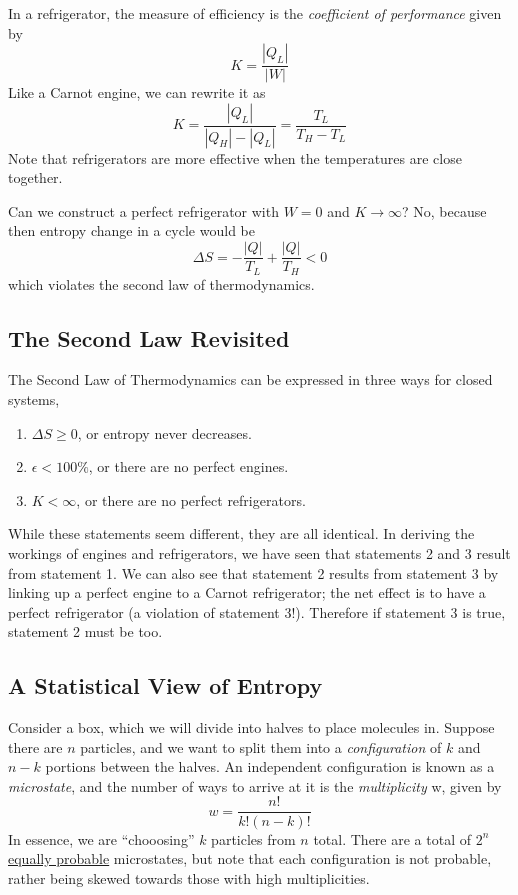 \documentclass[../PhysicsFormulae.tex]{subfiles}
\begin{document}
In a refrigerator, the measure of efficiency is the \textit{coefficient of performance} given by 
\[ K = \frac{|Q_L|}{|W|} \]
Like a Carnot engine, we can rewrite it as
\[ K = \frac{|Q_L|}{|Q_H| - |Q_L|} = \frac{T_L}{T_H - T_L} \]
Note that refrigerators are more effective when the temperatures are close together. \bigskip

Can we construct a perfect refrigerator with $W = 0$ and $K \rightarrow \infty$? No, because then entropy change in a cycle would be 
\[ \Delta S = -\frac{|Q|}{T_L} + \frac{|Q|}{T_H} < 0 \]
which violates the second law of thermodynamics. 

\subsection{The Second Law Revisited}
The Second Law of Thermodynamics can be expressed in three ways for closed systems,  
\begin{enumerate}
	\item $\Delta S \geq 0$, or entropy never decreases.
	\item $\epsilon < 100\%$, or there are no perfect engines.
	\item $ K < \infty $, or there are no perfect refrigerators.
\end{enumerate}
While these statements seem different, they are all identical. In deriving the workings of engines and refrigerators, we have seen that statements 2 and 3 result from statement 1. We can also see that statement 2 results from statement 3 by linking up a perfect engine to a Carnot refrigerator; the net effect is to have a perfect refrigerator (a violation of statement 3!). Therefore if statement 3 is true, statement 2 must be too. 

\subsection{A Statistical View of Entropy}
Consider a box, which we will divide into halves to place molecules in. Suppose there are $n$ particles, and we want to split them into a \textit{configuration} of $k$ and $n - k$ portions between the halves. An independent configuration is known as a \textit{microstate}, and the number of ways to arrive at it is the \textit{multiplicity} w, given by
\[ w = \frac{n!}{k!(n - k)!} \]
In essence, we are ``chooosing'' $k$ particles from $n$ total. There are a total of $2^n$ \underline{equally probable} microstates, but note that each configuration is not probable, rather being skewed towards those with high multiplicities. \bigskip
\end{document}
